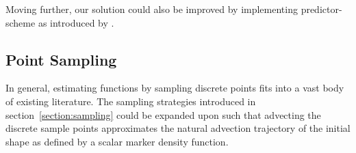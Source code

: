 Moving further, our solution could also be improved by implementing
predictor-scheme as introduced by \cite{holl2019pdecontrol}.

\subsection*{Point Sampling}
In general, estimating functions by sampling discrete points fits into a vast
body of existing literature. The sampling strategies introduced in
section~\ref{section:sampling} could be expanded upon such that advecting the
discrete sample points approximates the natural advection trajectory of the
initial shape as defined by a scalar marker density function.

